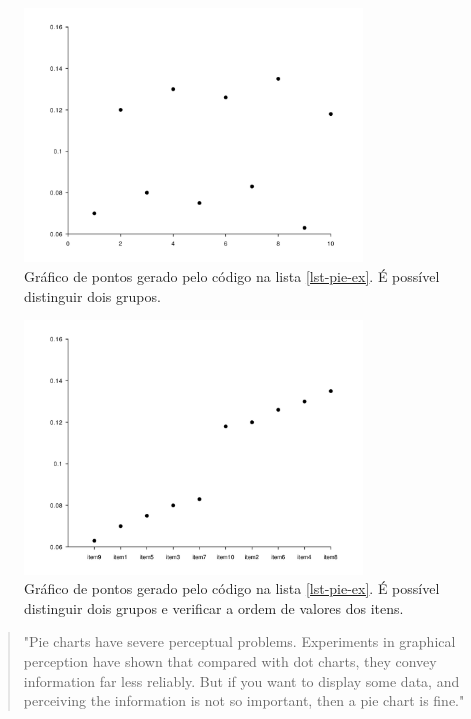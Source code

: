 \begin{frame}
\begin{figure}[h]
 \centering
  \includegraphics[width=0.8\textwidth,height=0.7\textheight,keepaspectratio]{figures/piex-dots.pdf}
 \caption{Gráfico de pontos gerado pelo código na lista \ref{lst-pie-ex}. É possível distinguir dois grupos.}
 \label{fig-piex2}
\end{figure}

\begin{figure}[h]
 \centering
  \includegraphics[width=0.8\textwidth,height=0.65\textheight,keepaspectratio]{figures/piex-dots-order.pdf}
 \caption{Gráfico de pontos gerado pelo código na lista \ref{lst-pie-ex}. É possível distinguir dois grupos e verificar a ordem de valores dos itens.}
 \label{fig-piex3}
\end{figure}

\begin{quote}
"Pie charts have severe perceptual problems. Experiments in graphical perception have shown
that compared with dot charts, they convey information far
less reliably. But if you want to display some data, and perceiving the information is not so important, then a pie chart
is fine." \cite{becker1996}
\end{quote}


\end{frame}
